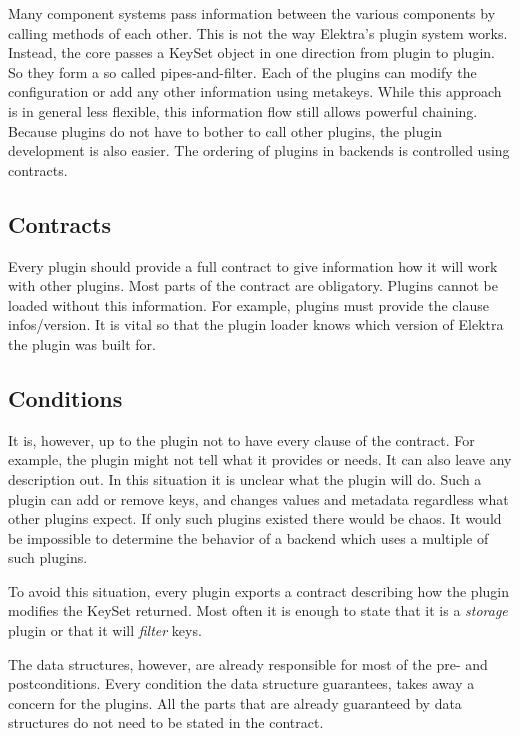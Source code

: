 Many component systems pass information between the various components by calling methods of each other. This is not the way Elektra’s plugin system works. Instead, the core passes a {\ttfamily Key\+Set} object in one direction from plugin to plugin. So they form a so called pipes-\/and-\/filter. Each of the plugins can modify the configuration or add any other information using metakeys. While this approach is in general less flexible, this information flow still allows powerful chaining. Because plugins do not have to bother to call other plugins, the plugin development is also easier. The ordering of plugins in backends is controlled using contracts.

\subsection*{Contracts}

Every plugin should provide a full contract to give information how it will work with other plugins. Most parts of the contract are obligatory. Plugins cannot be loaded without this information. For example, plugins must provide the clause {\ttfamily infos/version}. It is vital so that the plugin loader knows which version of Elektra the plugin was built for.

\subsection*{Conditions}

It is, however, up to the plugin not to have every clause of the contract. For example, the plugin might not tell what it provides or needs. It can also leave any description out. In this situation it is unclear what the plugin will do. Such a plugin can add or remove keys, and changes values and metadata regardless what other plugins expect. If only such plugins existed there would be chaos. It would be impossible to determine the behavior of a backend which uses a multiple of such plugins.

To avoid this situation, every plugin exports a contract describing how the plugin modifies the {\ttfamily Key\+Set} {\ttfamily returned}. Most often it is enough to state that it is a {\itshape storage} plugin or that it will {\itshape filter} keys.

The data structures, however, are already responsible for most of the pre-\/ and postconditions. Every condition the data structure guarantees, takes away a concern for the plugins. All the parts that are already guaranteed by data structures do not need to be stated in the contract.

